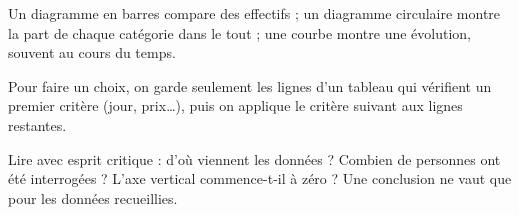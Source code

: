 \begin{propriete}Un diagramme en barres compare des effectifs ; un diagramme circulaire montre la part de chaque catégorie dans le tout ; une courbe montre une évolution, souvent au cours du temps.\end{propriete}
\begin{savoirfaire}[Filtrer]Pour faire un choix, on garde seulement les lignes d’un tableau qui vérifient un premier critère (jour, prix…), puis on applique le critère suivant aux lignes restantes.\end{savoirfaire}
\begin{attention}Lire avec esprit critique : d’où viennent les données ? Combien de personnes ont été interrogées ? L’axe vertical commence-t-il à zéro ? Une conclusion ne vaut que pour les données recueillies.\end{attention}

